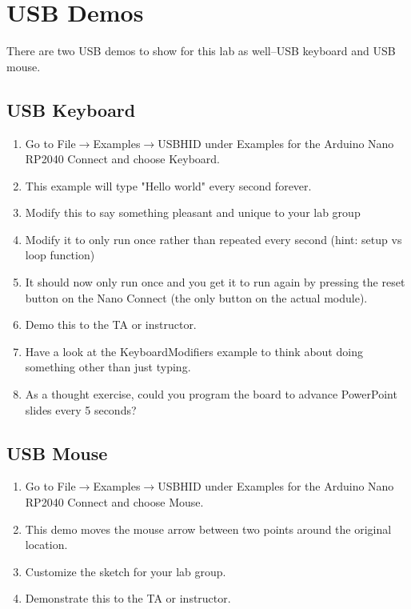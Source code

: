 \section{USB Demos}
There are two USB demos to show for this lab as well--USB keyboard and USB mouse.
\subsection{USB Keyboard}
\begin{enumerate}
  \item Go to File$\rightarrow$Examples$\rightarrow$USBHID under Examples for 
      the Arduino Nano RP2040 Connect and choose Keyboard. 
  \item This example will type "Hello world" every second forever. 
  \item Modify this to say something pleasant and unique to your lab group 
  \item Modify it to only run once rather than repeated every second (hint: setup vs loop function)
  \item It should now only run once and you get it to run again by pressing the reset button on the 
    Nano Connect (the only button on the actual module).
  \item Demo this to the TA or instructor.
  \item Have a look at the KeyboardModifiers example to think about doing something other than just typing.
  \item As a thought exercise, could you program the board to advance PowerPoint slides every 5 seconds?
\end{enumerate}

\subsection{USB Mouse}
\begin{enumerate}
  \item Go to File$\rightarrow$Examples$\rightarrow$USBHID under Examples for 
      the Arduino Nano RP2040 Connect and choose Mouse. 
  \item This demo moves the mouse arrow between two points around the original location.
  \item Customize the sketch for your lab group.
  \item Demonstrate this to the TA or instructor. 
\end{enumerate}

